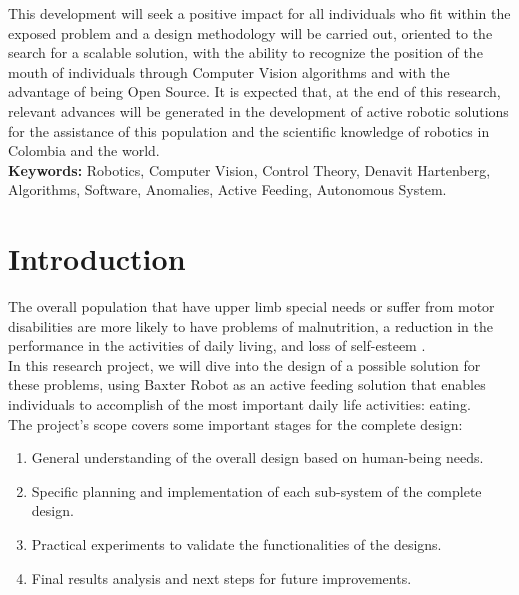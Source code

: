 \documentclass[11pt]{report} %
\begin{document}
This development will seek a positive impact for all individuals who fit within the exposed problem and a design methodology will be carried out, oriented to the search for a scalable solution, with the ability to recognize the position of the mouth of individuals through Computer Vision algorithms and with the advantage of being Open Source. It is expected that, at the end of this research, relevant advances will be generated in the development of active robotic solutions for the assistance of this population and the scientific knowledge of robotics in Colombia and the world.\\


\textbf{Keywords:} Robotics, Computer Vision, Control Theory, Denavit Hartenberg, Algorithms, Software, Anomalies, Active Feeding, Autonomous System.


\chapter*{Introduction}

The overall population that have upper limb special needs or suffer from motor disabilities are more likely to have problems of malnutrition, a reduction in the performance in the activities of daily living, and loss of self-esteem  \citep{cite_ICBF_technical_article, cite_upper_limb_disabilities_self_steem}.\\

In this research project, we will dive into the design of a possible solution for these problems, using Baxter Robot as an active feeding solution that enables individuals to accomplish of the most important daily life activities: eating.\\

The project's scope covers some important stages for the complete design: \\

\begin{enumerate}
    \item General understanding of the overall design based on human-being needs.
    \item Specific planning and implementation of each sub-system of the complete design.
    \item Practical experiments to validate the functionalities of the designs.
    \item Final results analysis and next steps for future improvements.
\end{enumerate}
\end{document}
